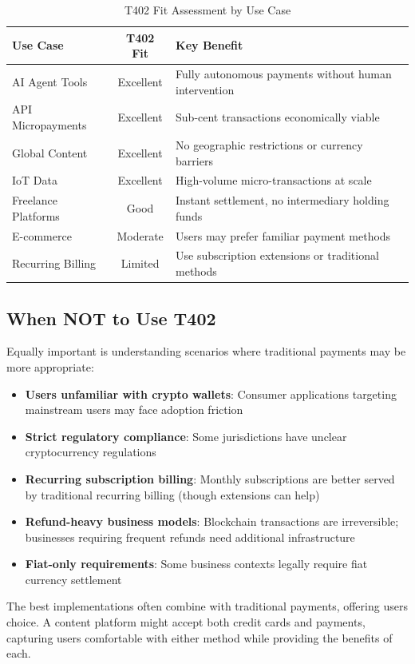 \begin{table}[htbp]
\centering
\caption{T402 Fit Assessment by Use Case}
\label{tab:fit-assessment}
\footnotesize
\begin{tabular}{l c p{5cm}}
\toprule
\textbf{Use Case} & \textbf{T402 Fit} & \textbf{Key Benefit} \\
\midrule
AI Agent Tools & Excellent & Fully autonomous payments without human intervention \\
API Micropayments & Excellent & Sub-cent transactions economically viable \\
Global Content & Excellent & No geographic restrictions or currency barriers \\
IoT Data & Excellent & High-volume micro-transactions at scale \\
Freelance Platforms & Good & Instant settlement, no intermediary holding funds \\
E-commerce & Moderate & Users may prefer familiar payment methods \\
Recurring Billing & Limited & Use subscription extensions or traditional methods \\
\bottomrule
\end{tabular}
\end{table}

\subsection{When NOT to Use T402}

Equally important is understanding scenarios where traditional payments may be more appropriate:

\begin{warningbox}
\begin{itemize}
    \item \textbf{Users unfamiliar with crypto wallets}: Consumer applications targeting mainstream users may face adoption friction
    \item \textbf{Strict regulatory compliance}: Some jurisdictions have unclear cryptocurrency regulations
    \item \textbf{Recurring subscription billing}: Monthly subscriptions are better served by traditional recurring billing (though \tprotocol{} extensions can help)
    \item \textbf{Refund-heavy business models}: Blockchain transactions are irreversible; businesses requiring frequent refunds need additional infrastructure
    \item \textbf{Fiat-only requirements}: Some business contexts legally require fiat currency settlement
\end{itemize}
\end{warningbox}

The best implementations often combine \tprotocol{} with traditional payments, offering users choice. A content platform might accept both credit cards and \tprotocol{} payments, capturing users comfortable with either method while providing the benefits of each.

